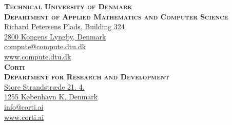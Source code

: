 
\thispagestyle{empty} %

\vspace*{\fill}
\small%
\noindent
\textsc{\textbf{Technical University of Denmark}}\\
\textsc{\textbf{Department of Applied Mathematics and Computer Science}}
\smallskip\\
\href{https://goo.gl/maps/Dx6rNjGT9Ad5xKgZ6}{%
Richard Petersens Plads, Building 324\\
2800 Kongens Lyngby, Denmark}\\
\href{mailto:compute@compute.dtu.dk}{compute@compute.dtu.dk}\\
\href{www.compute.dtu.dk}{www.compute.dtu.dk}
\bigskip\\
\noindent
\textsc{\textbf{Corti}}\\
\textsc{\textbf{Department for Research and Development}}
\smallskip\\
\href{https://goo.gl/maps/X7en4p8vaHkfVuyJ7}{%
Store Strandstræde 21. 4.\\
1255 København K, Denmark}\\
\href{mailto:info@corti.ai}{info@corti.ai}\\
\href{www.corti.ai}{www.corti.ai}\\

\normalsize
\normalfont